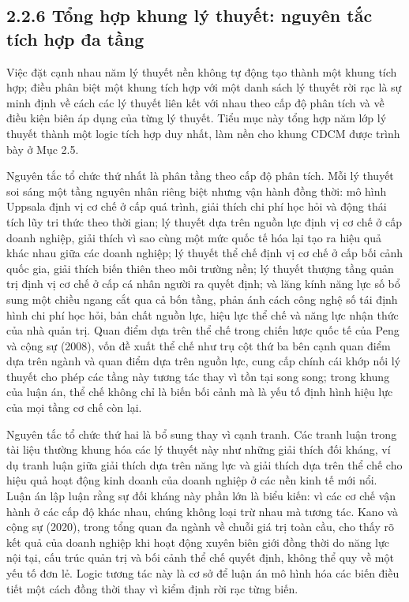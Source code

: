 \documentclass[
  a4paper,
  13pt]{extreport}
\begin{document}
\hypertarget{tux1ed5ng-hux1ee3p-khung-luxfd-thuyux1ebft-nguyuxean-tux1eafc-tuxedch-hux1ee3p-ux111a-tux1ea7ng}{%
\subsection{2.2.6 Tổng hợp khung lý thuyết: nguyên tắc tích hợp đa
tầng}\label{tux1ed5ng-hux1ee3p-khung-luxfd-thuyux1ebft-nguyuxean-tux1eafc-tuxedch-hux1ee3p-ux111a-tux1ea7ng}}

Việc đặt cạnh nhau năm lý thuyết nền không tự động tạo thành một khung
tích hợp; điều phân biệt một khung tích hợp với một danh sách lý thuyết
rời rạc là sự minh định về cách các lý thuyết liên kết với nhau theo cấp
độ phân tích và về điều kiện biên áp dụng của từng lý thuyết. Tiểu mục
này tổng hợp năm lớp lý thuyết thành một logic tích hợp duy nhất, làm
nền cho khung CDCM được trình bày ở Mục 2.5.

Nguyên tắc tổ chức thứ nhất là phân tầng theo cấp độ phân tích. Mỗi lý
thuyết soi sáng một tầng nguyên nhân riêng biệt nhưng vận hành đồng
thời: mô hình Uppsala định vị cơ chế ở cấp quá trình, giải thích chi phí
học hỏi và động thái tích lũy tri thức theo thời gian; lý thuyết dựa
trên nguồn lực định vị cơ chế ở cấp doanh nghiệp, giải thích vì sao cùng
một mức quốc tế hóa lại tạo ra hiệu quả khác nhau giữa các doanh nghiệp;
lý thuyết thể chế định vị cơ chế ở cấp bối cảnh quốc gia, giải thích
biến thiên theo môi trường nền; lý thuyết thượng tầng quản trị định vị
cơ chế ở cấp cá nhân người ra quyết định; và lăng kính năng lực số bổ
sung một chiều ngang cắt qua cả bốn tầng, phản ánh cách công nghệ số tái
định hình chi phí học hỏi, bản chất nguồn lực, hiệu lực thể chế và năng
lực nhận thức của nhà quản trị. Quan điểm dựa trên thể chế trong chiến
lược quốc tế của Peng và cộng sự (2008), vốn đề xuất thể chế như trụ cột
thứ ba bên cạnh quan điểm dựa trên ngành và quan điểm dựa trên nguồn
lực, cung cấp chính cái khớp nối lý thuyết cho phép các tầng này tương
tác thay vì tồn tại song song; trong khung của luận án, thể chế không
chỉ là biến bối cảnh mà là yếu tố định hình hiệu lực của mọi tầng cơ chế
còn lại.

Nguyên tắc tổ chức thứ hai là bổ sung thay vì cạnh tranh. Các tranh luận
trong tài liệu thường khung hóa các lý thuyết này như những giải thích
đối kháng, ví dụ tranh luận giữa giải thích dựa trên năng lực và giải
thích dựa trên thể chế cho hiệu quả hoạt động kinh doanh của doanh
nghiệp ở các nền kinh tế mới nổi. Luận án lập luận rằng sự đối kháng này
phần lớn là biểu kiến: vì các cơ chế vận hành ở các cấp độ khác nhau,
chúng không loại trừ nhau mà tương tác. Kano và cộng sự (2020), trong
tổng quan đa ngành về chuỗi giá trị toàn cầu, cho thấy rõ kết quả của
doanh nghiệp khi hoạt động xuyên biên giới đồng thời do năng lực nội
tại, cấu trúc quản trị và bối cảnh thể chế quyết định, không thể quy về
một yếu tố đơn lẻ. Logic tương tác này là cơ sở để luận án mô hình hóa
các biến điều tiết một cách đồng thời thay vì kiểm định rời rạc từng
biến.
\end{document}
